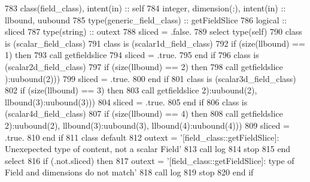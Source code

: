 \begin{DoxyCode}
783     \textcolor{keywordtype}{class}(field\_class), \textcolor{keywordtype}{intent(in)} :: self
784     \textcolor{keywordtype}{integer}, \textcolor{keywordtype}{dimension(:)}, \textcolor{keywordtype}{intent(in)} :: llbound, uubound
785     \textcolor{keywordtype}{type}(generic\_field\_class) :: getFieldSlice
786     \textcolor{keywordtype}{logical} :: sliced
787     \textcolor{keywordtype}{type}(string) :: outext
788     sliced = .false.
789     \textcolor{keywordflow}{select type}(self)
790 \textcolor{keywordflow}{    class is} (scalar\_field\_class)
791 \textcolor{keywordflow}{    class is} (scalar1d\_field\_class)
792         \textcolor{keywordflow}{if} (\textcolor{keyword}{size}(llbound) == 1) \textcolor{keywordflow}{then}
793             \textcolor{keyword}{call }getfieldslice%
794             sliced = .true.
795 \textcolor{keywordflow}{        end if}
796 \textcolor{keywordflow}{    class is} (scalar2d\_field\_class)
797         \textcolor{keywordflow}{if} (\textcolor{keyword}{size}(llbound) == 2) \textcolor{keywordflow}{then}
798             \textcolor{keyword}{call }getfieldslice%
      ):uubound(2)))
799             sliced = .true.
800 \textcolor{keywordflow}{        end if}
801 \textcolor{keywordflow}{    class is} (scalar3d\_field\_class)
802         \textcolor{keywordflow}{if} (\textcolor{keyword}{size}(llbound) == 3) \textcolor{keywordflow}{then}
803             \textcolor{keyword}{call }getfieldslice%
      2):uubound(2), llbound(3):uubound(3)))
804             sliced = .true.
805 \textcolor{keywordflow}{        end if}
806 \textcolor{keywordflow}{    class is} (scalar4d\_field\_class)
807         \textcolor{keywordflow}{if} (\textcolor{keyword}{size}(llbound) == 4) \textcolor{keywordflow}{then}
808             \textcolor{keyword}{call }getfieldslice%
      2):uubound(2), llbound(3):uubound(3), llbound(4):uubound(4)))
809             sliced = .true.
810 \textcolor{keywordflow}{        end if}
811 \textcolor{keywordflow}{        class default}
812         outext = \textcolor{stringliteral}{'[field\_class::getFieldSlice]: Unexepected type of content, not a scalar Field'}
813         \textcolor{keyword}{call }log%
814         stop
815 \textcolor{keywordflow}{    end select}
816     \textcolor{keywordflow}{if} (.not.sliced) \textcolor{keywordflow}{then}
817         outext = \textcolor{stringliteral}{'[field\_class::getFieldSlice]: type of Field and dimensions do not match'}
818         \textcolor{keyword}{call }log%
819         stop
820 \textcolor{keywordflow}{    end if}
\end{DoxyCode}
\mbox{\label{namespacefieldtypes__mod_a5faf9c157541acaa9681be2d59eda850}} 
